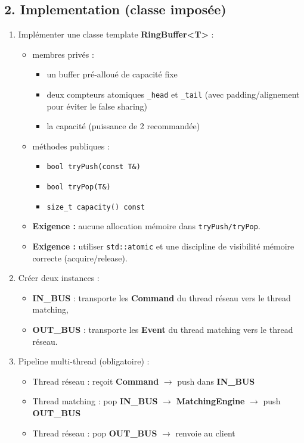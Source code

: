\documentclass[11pt,a4paper]{article}
\begin{document}
\subsection*{2. Implementation (classe imposée)}
\begin{enumerate}
  \item Implémenter une classe template \textbf{RingBuffer<T>} :
  \begin{itemize}
    \item membres privés :
      \begin{itemize}
        \item un buffer pré-alloué de capacité fixe
        \item deux compteurs atomiques \texttt{\_head} et \texttt{\_tail} (avec padding/alignement pour éviter le false sharing)
        \item la capacité (puissance de 2 recommandée)
      \end{itemize}
    \item méthodes publiques :
      \begin{itemize}
        \item \texttt{bool tryPush(const T\&)}
        \item \texttt{bool tryPop(T\&)}
        \item \texttt{size\_t capacity() const}
      \end{itemize}
    \item \textbf{Exigence :} aucune allocation mémoire dans \texttt{tryPush/tryPop}.
    \item \textbf{Exigence :} utiliser \texttt{std::atomic} et une discipline de visibilité mémoire correcte (acquire/release).
  \end{itemize}

  \item Créer deux instances :
  \begin{itemize}
    \item \textbf{IN\_BUS} : transporte les \textbf{Command} du thread réseau vers le thread matching,
    \item \textbf{OUT\_BUS} : transporte les \textbf{Event} du thread matching vers le thread réseau.
  \end{itemize}

  \item Pipeline multi-thread (obligatoire) :
  \begin{itemize}
    \item Thread réseau : reçoit \textbf{Command} $\rightarrow$ push dans \textbf{IN\_BUS}
    \item Thread matching : pop \textbf{IN\_BUS} $\rightarrow$ \textbf{MatchingEngine} $\rightarrow$ push \textbf{OUT\_BUS}
    \item Thread réseau : pop \textbf{OUT\_BUS} $\rightarrow$ renvoie au client
  \end{itemize}


\end{enumerate}
\end{document}
